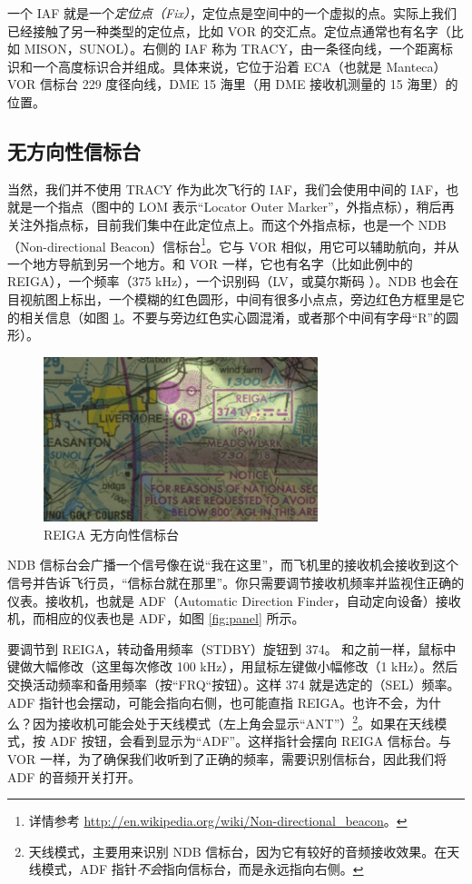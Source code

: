 一个 IAF 就是一个\emph{定位点（Fix）}，定位点是空间中的一个虚拟的点。实际上我们已经接触了另一种类型的定位点，比如 VOR 的交汇点。定位点通常也有名字（比如 MISON，SUNOL）。右侧的 IAF 称为 TRACY，由一条径向线，一个距离标识和一个高度标识合并组成。具体来说，它位于沿着 ECA（也就是 Manteca）VOR 信标台 229 度径向线，DME 15 海里（用 DME 接收机测量的 15 海里）的位置。

\subsection{无方向性信标台}

当然，我们并不使用 TRACY 作为此次飞行的 IAF，我们会使用中间的 IAF，也就是一个指点（图中的 LOM 表示“Locator Outer Marker”，外指点标），稍后再关注外指点标，目前我们集中在此定位点上。而这个外指点标，也是一个 NDB（Non-directional Beacon）信标台\footnote{详情参考 \url{http://en.wikipedia.org/wiki/Non-directional_beacon}。}。它与 VOR 相似，用它可以辅助航向，并从一个地方导航到另一个地方。和 VOR 一样，它也有名字（比如此例中的 REIGA），一个频率（375 kHz），一个识别码（LV，或莫尔斯码 {\mdot\mdash\mdot\mdot\mspace \mdot\mdot\mdot\mdash}）。NDB 也会在目视航图上标出，一个模糊的红色圆形，中间有很多小点点，旁边红色方框里是它的相关信息（如图 \ref{fig:NDB}。不要与旁边红色实心圆混淆，或者那个中间有字母“R”的圆形）。

\begin{figure}
  \begin{center}
    \includegraphics[width=8cm]{img/NDB}
    \caption{REIGA 无方向性信标台}
    \label{fig:NDB}
  \end{center}
\end{figure}

NDB 信标台会广播一个信号像在说“我在这里”，而飞机里的接收机会接收到这个信号并告诉飞行员，“信标台就在那里”。你只需要调节接收机频率并监视住正确的仪表。接收机，也就是 ADF（Automatic Direction Finder，自动定向设备）接收机，而相应的仪表也是 ADF，如图 \ref{fig:panel} 所示。

要调节到 REIGA，转动备用频率（STDBY）旋钮到 374。 和之前一样，鼠标中键做大幅修改（这里每次修改 100 kHz），用鼠标左键做小幅修改（1 kHz）。然后交换活动频率和备用频率（按“FRQ“按钮）。这样 374 就是选定的（SEL）频率。ADF 指针也会摆动，可能会指向右侧，也可能直指 REIGA。也许不会，为什么？因为接收机可能会处于天线模式（左上角会显示“ANT”）\footnote{天线模式，主要用来识别 NDB 信标台，因为它有较好的音频接收效果。在天线模式，ADF 指针\emph{不会}指向信标台，而是永远指向右侧。}。如果在天线模式，按 ADF 按钮，会看到显示为“ADF”。这样指针会摆向 REIGA 信标台。与 VOR 一样，为了确保我们收听到了正确的频率，需要识别信标台，因此我们将 ADF 的音频开关打开。

